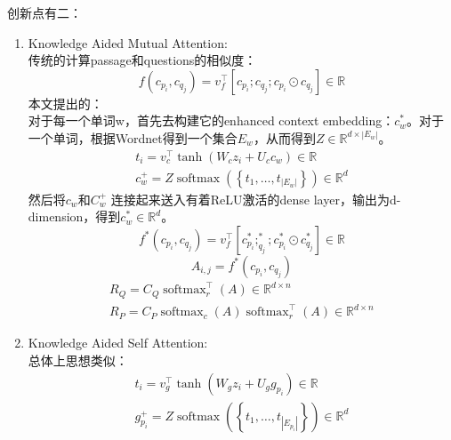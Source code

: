 \documentclass[a4paper,UTF8]{article}
\numberwithin{equation}{section}
\begin{document}
创新点有二：
\begin{enumerate}
	\item Knowledge Aided Mutual Attention:\\
	传统的计算passage和questions的相似度：
	\begin{equation}
		f\left(c_{p_{i}}, c_{q_{j}}\right)=v_{f}^{\top}\left[c_{p_{i}} ; c_{q_{j}} ; c_{p_{i}} \odot c_{q_{j}}\right] \in \mathbb{R}
		\end{equation}
	本文提出的：\\
	对于每一个单词w，首先去构建它的enhanced context embedding：$c_w^*$。对于一个单词，根据Wordnet得到一个集合$E_w$，从而得到$Z \in \mathbb{R}^{d \times\left|E_{w}\right|}$。
	\begin{equation}
	\begin{array}{c}{t_{i}=v_{c}^{\top} \tanh \left(W_{c} z_{i}+U_{c} c_{w}\right) \in \mathbb{R}} \\ {c_{w}^{+}=Z \operatorname{softmax}\left(\left\{t_{1}, \ldots, t_{\left|E_{w}\right|}\right\}\right) \in \mathbb{R}^{d}}\end{array}
	\end{equation}
	然后将$c_w$和$C_w^+$ 连接起来送入有着ReLU激活的dense layer，输出为d-dimension，得到$c_{w}^{*} \in \mathbb{R}^{d}$。
	\begin{equation}
		f^{*}\left(c_{p_{i}}, c_{q_{j}}\right)=v_{f}^{\top}\left[c_{p_{i}}^{*} ;_{q_{j}}^{*} ; c_{p_{i}}^{*} \odot c_{q_{j}}^{*}\right] \in \mathbb{R}
		\end{equation}
		\begin{equation}
			A_{i, j}=f^{*}\left(c_{p_{i}}, c_{q_{j}}\right)
			\end{equation}
			\begin{equation}
			\begin{array}{c}{R_{Q}=C_{Q} \operatorname{softmax}_{r}^{\top}(A) \in \mathbb{R}^{d \times n}} \\ {R_{P}=C_{P} \operatorname{softmax}_{c}(A) \operatorname{softmax}_{r}^{\top}(A) \in \mathbb{R}^{d \times n}}\end{array}
			\end{equation}
	\item Knowledge Aided Self Attention:\\
	总体上思想类似：
	\begin{equation}
	\begin{array}{c}{t_{i}=v_{g}^{\top} \tanh \left(W_{g} z_{i}+U_{g} g_{p_{i}}\right) \in \mathbb{R}} \\ {g_{p_{i}}^{+}=Z \operatorname{softmax}\left(\left\{t_{1}, \ldots, t_{\left|E_{p_{i}}\right|}\right\}\right) \in \mathbb{R}^{d}}\end{array}
	\end{equation}
\end{enumerate}
\end{document}
